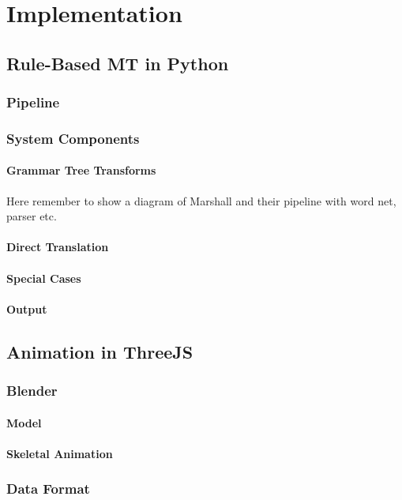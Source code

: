 \documentclass[12pt]{ociamthesis}  %
\begin{document}
\chapter{Implementation}
\label{implementation}

\section{Rule-Based MT in Python}
	\subsection{Pipeline}
	\subsection{System Components}
		\subsubsection{Grammar Tree Transforms}
		Here remember to show a diagram of Marshall and their pipeline with word net, parser etc.
		\subsubsection{Direct Translation}
		\subsubsection{Special Cases}
		\subsubsection{Output}
	
\section{Animation in ThreeJS}
	\subsection{Blender}
		\subsubsection{Model}
		\subsubsection{Skeletal Animation}
	\subsection{Data Format}
\end{document}
